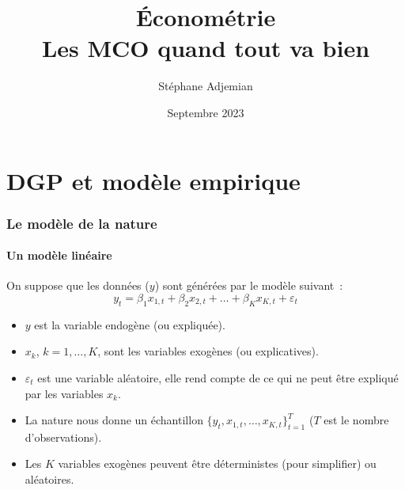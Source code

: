 \documentclass[10pt]{beamer}
\theoremstyle{plain}
\begin{document}
\title{Économétrie\\\small{Les MCO quand tout va bien}}
\author[S. Adjemian]{Stéphane Adjemian}
\date{Septembre 2023}

\begin{frame}
  \titlepage{}
\end{frame}

\section{DGP et modèle empirique}

\begin{frame}
  \frametitle{Le modèle de la nature}
  \framesubtitle{Un modèle linéaire}

  \bigskip

  On suppose que les données ($y$) sont générées par le modèle suivant~:
  \[
    y_t = \beta_1x_{1,t} + \beta_2x_{2,t} + \dots + \beta_Kx_{K,t} + \varepsilon_t
  \]

  \bigskip

  \begin{itemize}
  
  \item $y$ est la variable endogène (ou expliquée).\newline

  \item $x_{k}$, $k=1,\ldots,K$, sont les variables exogènes (ou explicatives).\newline

  \item $\varepsilon_t$ est une variable aléatoire, elle rend compte de ce qui ne peut être expliqué par les variables $x_k$.\newline

  \item La nature nous donne un échantillon $\{y_t,x_{1,t},\ldots,x_{K,t}\}_{t=1}^T$ ($T$ est le nombre d'observations).\newline

  \item Les $K$ variables exogènes peuvent être déterministes (pour simplifier) ou aléatoires.\newline

  \end{itemize}

\end{frame}
\end{document}
